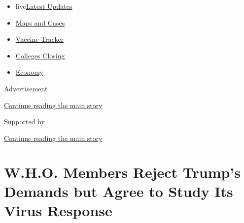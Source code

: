 \begin{itemize}
\tightlist
\item
  live\href{https://www.nytimes3xbfgragh.onion/2020/08/21/world/covid-19-coronavirus.html?name=styln-coronavirus-national\&region=TOP_BANNER\&variant=undefined\&block=storyline_menu_recirc\&action=click\&pgtype=Article\&impression_id=c82e3b81-e3aa-11ea-a48e-b9252519409f}{Latest
  Updates}
\item
  \href{https://www.nytimes3xbfgragh.onion/interactive/2020/us/coronavirus-us-cases.html?name=styln-coronavirus-national\&region=TOP_BANNER\&variant=undefined\&block=storyline_menu_recirc\&action=click\&pgtype=Article\&impression_id=c82e6290-e3aa-11ea-a48e-b9252519409f}{Maps
  and Cases}
\item
  \href{https://www.nytimes3xbfgragh.onion/interactive/2020/science/coronavirus-vaccine-tracker.html?name=styln-coronavirus-national\&region=TOP_BANNER\&variant=undefined\&block=storyline_menu_recirc\&action=click\&pgtype=Article\&impression_id=c82e6291-e3aa-11ea-a48e-b9252519409f}{Vaccine
  Tracker}
\item
  \href{https://www.nytimes3xbfgragh.onion/2020/08/19/us/colleges-closing-covid.html?name=styln-coronavirus-national\&region=TOP_BANNER\&variant=undefined\&block=storyline_menu_recirc\&action=click\&pgtype=Article\&impression_id=c82e6292-e3aa-11ea-a48e-b9252519409f}{Colleges
  Closing}
\item
  \href{https://www.nytimes3xbfgragh.onion/live/2020/08/21/business/stock-market-today-coronavirus?name=styln-coronavirus-national\&region=TOP_BANNER\&variant=undefined\&block=storyline_menu_recirc\&action=click\&pgtype=Article\&impression_id=c82e6293-e3aa-11ea-a48e-b9252519409f}{Economy}
\end{itemize}

Advertisement

\protect\hyperlink{after-top}{Continue reading the main story}

Supported by

\protect\hyperlink{after-sponsor}{Continue reading the main story}

\hypertarget{who-members-reject-trumps-demands-but-agree-to-study-its-virus-response}{%
\section{W.H.O. Members Reject Trump's Demands but Agree to Study Its
Virus
Response}\label{who-members-reject-trumps-demands-but-agree-to-study-its-virus-response}}

